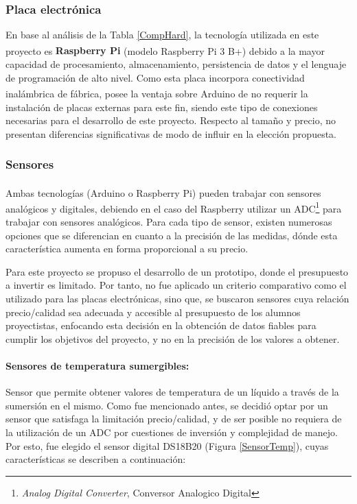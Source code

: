         \subsubsection{Placa electrónica}
            \par En base al análisis de la Tabla \ref{CompHard}, la tecnología utilizada en este proyecto es \textbf{Raspberry\textsuperscript{\textregistered} Pi} (modelo Raspberry\textsuperscript{\textregistered} Pi 3 B+) debido a la mayor capacidad de procesamiento, almacenamiento, persistencia de datos y el lenguaje de programación de alto nivel. Como esta placa incorpora conectividad inalámbrica de fábrica, posee la ventaja sobre Arduino\textsuperscript{\textregistered} de no requerir la instalación de placas externas para este fin, siendo este tipo de conexiones necesarias para el desarrollo de este proyecto. Respecto al tamaño y precio, no presentan diferencias significativas de modo de influir en la elección propuesta.

        \subsubsection{Sensores}
            \par Ambas tecnologías (Arduino\textsuperscript{\textregistered} o Raspberry\textsuperscript{\textregistered} Pi) pueden trabajar con sensores analógicos y digitales, debiendo en el caso del Raspberry\textsuperscript{\textregistered} utilizar un ADC\footnote{\textit{Analog Digital Converter}, Conversor Analogico Digital} para trabajar con sensores analógicos. Para cada tipo de sensor, existen numerosas opciones que se diferencian en cuanto a la precisión de las medidas, dónde esta característica aumenta en forma proporcional a su precio. 
            
            \par Para este proyecto se propuso el desarrollo de un prototipo, donde el presupuesto a invertir es limitado. Por tanto, no fue aplicado un criterio comparativo como el utilizado para las placas electrónicas, sino que, se buscaron sensores cuya relación precio/calidad sea adecuada y accesible al presupuesto de los alumnos proyectistas, enfocando esta decisión en la obtención de datos fiables para cumplir los objetivos del proyecto, y no en la precisión de los valores a obtener.
            
            \paragraph{Sensores de temperatura sumergibles:}Sensor que permite obtener valores de temperatura de un líquido a través de la sumersión en el mismo. Como fue mencionado antes, se decidió optar por un sensor que satisfaga la limitación precio/calidad, y de ser posible no requiera de la utilización de un ADC por cuestiones de inversión y complejidad de manejo. Por esto, fue elegido el sensor digital DS18B20 (Figura \ref{SensorTemp}), cuyas características se describen a continuación:
            
